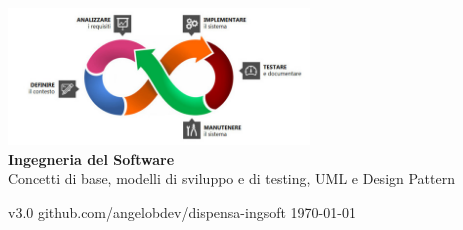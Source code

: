 \documentclass[a4paper,12pt,oneside]{book}
\begin{document}
\frontmatter

\begin{titlepage}
  \centering

  \includegraphics[width=0.6\textwidth]{assets/logo.jpg}\\[3cm]

  {\huge\bfseries Ingegneria del Software}\\[0.5cm]

  {\Large Concetti di base, modelli di sviluppo e di testing, UML e Design Pattern}\\[0.5cm]

  \vfill

  {\small v3.0 \hfill github.com/angelobdev/dispensa-ingsoft \hfill \today }\\[0.5cm]

\end{titlepage}

\tableofcontents

\mainmatter









\backmatter

\end{document}
